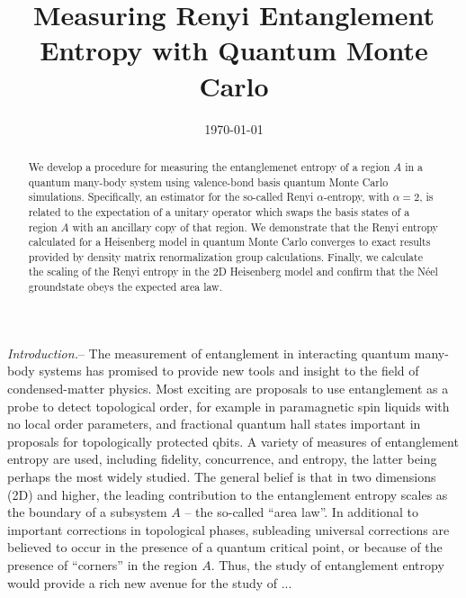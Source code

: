 \documentclass[prl,aps,twocolumn,floatfix,amsmath,amssymb,superscriptaddress,tightenlines]{revtex4}
\begin{document}
\date{\today}
\title{Measuring Renyi Entanglement Entropy with Quantum Monte Carlo}

%
%
%

\begin{abstract} 
We develop a procedure for measuring the entanglemenet entropy of a region $A$ in a quantum
many-body system using valence-bond basis quantum Monte Carlo simulations.  Specifically, an 
estimator for the so-called Renyi $\alpha$-entropy, with $\alpha = 2$, is related to the expectation of
a unitary operator which swaps the basis states of a region $A$ with an ancillary copy of that region.
We demonstrate that the Renyi entropy calculated for a Heisenberg model in quantum Monte Carlo 
converges to exact results provided by density matrix renormalization group calculations.  Finally, we 
calculate the scaling of the Renyi entropy in the 2D Heisenberg model and confirm that the N\'eel 
groundstate obeys the expected area law.
\end{abstract}
\maketitle

{\it Introduction.}-- 
The measurement of entanglement in interacting quantum many-body systems has promised to provide
new tools and insight to the field of condensed-matter physics.  Most exciting are proposals to use 
entanglement as a probe to detect topological order, for example in paramagnetic spin liquids with no 
local order parameters, and fractional quantum hall states important in proposals for topologically protected qbits.  
A variety of measures of entanglement entropy are used, including fidelity, concurrence, and entropy, the 
latter being perhaps the most widely studied.  The general belief is that in two dimensions (2D) and higher, the 
leading contribution to the entanglement entropy scales as the boundary of a subsystem $A$ -- the so-called
``area law''.  In additional to important corrections in topological phases, subleading universal corrections are
believed to occur in the presence of a quantum critical point, or because of the presence of ``corners'' in the region
$A$.  Thus, the study of entanglement entropy would provide a rich new avenue for the study of ...
\end{document}
